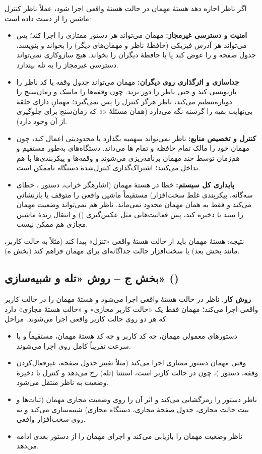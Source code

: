 اگر ناظر اجازه دهد هستهٔ مهمان در حالت هستهٔ واقعی اجرا شود، عملاً ناظر کنترل ماشین را از دست داده است:
\begin{itemize}
  \item \textbf{امنیت و دسترسی غیرمجاز:} مهمان می‌تواند هر دستور ممتازی را اجرا کند؛ پس می‌تواند هر آدرس فیزیکی (حافظهٔ ناظر و مهمان‌های دیگر) را بخواند و بنویسد، جدول صفحه و  را عوض کند یا با  حافظهٔ دیگران را بخواند. هیچ سازوکاری نمی‌تواند دسترسی غیرمجاز را به تله بیندازد.
  \item \textbf{جداسازی و اثرگذاری روی دیگران:} مهمان می‌تواند جدول وقفه یا کد ناظر را بازنویسی کند و حتی ناظر را دور بزند. چون وقفه‌ها را ماسک و زمان‌سنج را دوباره‌تنظیم می‌کند، ناظر هرگز کنترل  را پس نمی‌گیرد؛ مهمانِ دارای حلقهٔ بی‌نهایت بقیه را گرسنه نگه می‌دارد (همان مسئلهٔ «» که زمان‌سنج برای جلوگیری از آن وجود دارد).
  \item \textbf{کنترل و تخصیص منابع:} ناظر نمی‌تواند سهمیه بگذارد یا محدودیتی اعمال کند، چون مهمان خود را مالک تمام حافظه و تمام ها می‌داند. دستگاه‌های  به‌طور مستقیم و هم‌زمان توسط چند مهمان برنامه‌ریزی می‌شوند و وقفه‌ها و پیکربندی‌ها با هم تداخل می‌کنند؛ اشتراک‌گذاری کنترل‌شدهٔ دستگاه ناممکن است.
  \item \textbf{پایداری کل سیستم:} خطا در هستهٔ مهمان (اشارهگر خراب، دستور ، خطای سه‌گانه، پیکربندی غلط سخت‌افزار) مستقیماً ماشین واقعی را متوقف یا بازنشانی می‌کند و فقط به همان مهمان محدود نمی‌ماند. ناظر هم نمی‌تواند وضعیت مهمان را ببیند یا ذخیره کند، پس فعالیت‌هایی مثل عکس‌گیری () و انتقال زندهٔ ماشین مجازی هم ممکن نیست.
\end{itemize}

نتیجه: هستهٔ مهمان باید از حالت هستهٔ واقعی «تنزل» پیدا کند (مثلاً به حالت کاربر، مانند بخش بعد) یا سخت‌افزار حالت جداگانه‌ای برای مهمان فراهم کند (بخش ه).

\subsection*{بخش ج – روش «تله و شبیه‌سازی» ()}

\textbf{روش کار.} ناظر در حالت هستهٔ واقعی اجرا می‌شود و هستهٔ مهمان را در حالت کاربر واقعی اجرا می‌کند؛ مهمان فقط یک «حالت کاربر مجازی» و «حالت هستهٔ مجازی» دارد که هر دو روی حالت کاربر واقعی اجرا می‌شوند. مراحل:
\begin{itemize}
  \item دستورهای معمولی مهمان، چه کد کاربر و چه کد هستهٔ مهمان، مستقیماً و با سرعت تقریباً کامل روی  اجرا می‌شوند.
  \item وقتی مهمان دستور ممتازی اجرا می‌کند (مثلاً تغییر جدول صفحه، غیرفعال‌کردن وقفه، دستور )، چون  در حالت کاربر است، استثنا (تله) رخ می‌دهد و کنترل با ذخیرهٔ وضعیت به ناظر منتقل می‌شود.
  \item ناظر دستور را رمزگشایی می‌کند و اثر آن را روی وضعیت مجازی مهمان (ثبات‌ها و بیت حالت مجازی، جدول صفحهٔ مجازی، دستگاه مجازی) شبیه‌سازی می‌کند و نه روی سخت‌افزار واقعی.
  \item ناظر وضعیت مهمان را بازیابی می‌کند و اجرای مهمان را از دستور بعدی ادامه می‌دهد.
\end{itemize}

